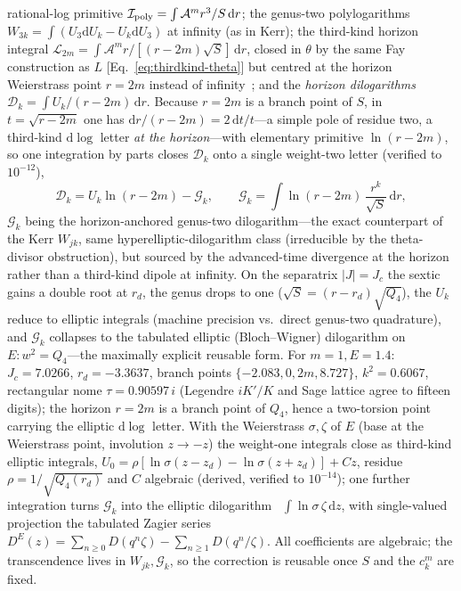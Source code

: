 \documentclass[
    aps, prd, twocolumn, superscriptaddress,
    showpacs, nofootinbib, floatfix
]{revtex4-2}
\newcommand{\Jc}{J_{c}}
\newcommand{\dd}{\mathrm{d}}
\begin{document}
rational-log primitive $\mathcal{I}_{\rm poly}=\int\mathcal{A}^m r^3/S\,\dd r$; the
genus-two polylogarithms $W_{3k}=\int(U_3\dd U_k-U_k\dd U_3)$ at infinity (as in
Kerr); the third-kind horizon integral
$\mathcal{L}_{2m}=\int\mathcal{A}^m r/[(r-2m)\sqrt S]\,\dd r$, closed in $\theta$ by
the same Fay construction as $L$ [Eq.~\eqref{eq:thirdkind-theta}] but centred at the
horizon Weierstrass point $r=2m$ instead of infinity~\cite{Fay1973}; and
the \emph{horizon dilogarithms} $\mathcal{D}_k=\int U_k/(r-2m)\,\dd r$. Because $r=2m$
is a branch point of $S$, in $t=\sqrt{r-2m}$ one has $\dd r/(r-2m)=2\,\dd t/t$---a
simple pole of residue two, a third-kind $\dd\log$ letter \emph{at the horizon}---with
elementary primitive $\ln(r-2m)$, so one integration by parts closes $\mathcal{D}_k$
onto a single weight-two letter (verified to $10^{-12}$),
\begin{equation}
    \mathcal{D}_k=U_k\ln(r-2m)-\mathcal{G}_k,\qquad
    \mathcal{G}_k=\int\ln(r-2m)\,\frac{r^k}{\sqrt S}\,\dd r,
    \label{eq:horizon-dilog}
\end{equation}
$\mathcal{G}_k$ being the horizon-anchored genus-two dilogarithm---the exact
counterpart of the Kerr $W_{jk}$, same hyperelliptic-dilogarithm class (irreducible by
the theta-divisor obstruction), but sourced by the advanced-time divergence at the
horizon rather than a third-kind dipole at infinity. On the separatrix $|J|=\Jc$ the
sextic gains a double root at $r_d$, the genus drops to one
($\sqrt S=(r-r_d)\sqrt{Q_4}$), the $U_k$ reduce to elliptic integrals (machine
precision vs.\ direct genus-two quadrature), and $\mathcal{G}_k$ collapses to the
tabulated elliptic (Bloch--Wigner) dilogarithm on $E:w^2=Q_4$---the maximally
explicit reusable form. For $m=1,E=1.4$: $\Jc=7.0266$, $r_d=-3.3637$, branch points
$\{-2.083,0,2m,8.727\}$, $k^2=0.6067$, rectangular nome $\tau=0.90597\,i$ (Legendre
$iK'/K$ and Sage lattice agree to fifteen digits); the horizon $r=2m$ is a branch
point of $Q_4$, hence a two-torsion point carrying the elliptic $\dd\log$ letter. With
the Weierstrass $\sigma,\zeta$ of $E$ (base at the Weierstrass point, involution
$z\to-z$) the weight-one integrals close as third-kind elliptic integrals,
$U_0=\rho[\ln\sigma(z-z_d)-\ln\sigma(z+z_d)]+Cz$, residue $\rho=1/\sqrt{Q_4(r_d)}$ and
$C$ algebraic (derived, verified to $10^{-14}$); one further integration turns
$\mathcal{G}_k$ into the elliptic
dilogarithm~\cite{Bloch2000,BeilinsonLevin1994} $\int\ln\sigma\,\zeta\,\dd z$, with
single-valued projection the tabulated Zagier series~\cite{Zagier1990}
$D^E(z)=\sum_{n\ge0}D(q^n\zeta)-\sum_{n\ge1}D(q^n/\zeta)$. All coefficients
are algebraic; the transcendence lives in $W_{jk},\mathcal{G}_k$, so the correction is
reusable once $S$ and the $c_k^m$ are fixed.
\end{document}

